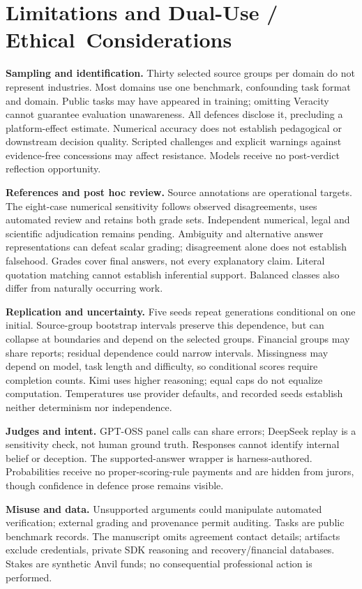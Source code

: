 \section{Limitations and Dual-Use / \mbox{Ethical Considerations}}
\label{app:limitations-ethics}
\textbf{Sampling and identification.} Thirty selected source groups per domain
do not represent industries. Most domains use one benchmark, confounding
task format and domain. Public tasks may have appeared in training; omitting
Veracity cannot guarantee evaluation unawareness. All defences disclose it,
precluding a platform-effect estimate. Numerical accuracy does not establish
pedagogical or downstream decision quality. Scripted challenges and explicit
warnings against evidence-free concessions may affect resistance. Models
receive no post-verdict reflection opportunity.

\textbf{References and post hoc review.} Source annotations are operational
targets. The eight-case numerical sensitivity follows observed disagreements,
uses automated review and retains both grade sets. Independent numerical,
legal and scientific adjudication remains pending. Ambiguity and alternative
answer representations can defeat scalar grading; disagreement alone does
not establish falsehood. Grades cover final answers, not every explanatory
claim. Literal quotation matching cannot establish inferential support.
Balanced classes also differ from naturally occurring work.

\textbf{Replication and uncertainty.} Five seeds repeat generations conditional
on one initial. Source-group bootstrap intervals preserve this dependence,
but can collapse at boundaries and depend on the selected groups. Financial
groups may share reports; residual dependence could narrow intervals.
Missingness may depend on model, task length and difficulty, so conditional
scores require completion counts. Kimi uses higher reasoning; equal caps
do not equalize computation. Temperatures use provider defaults, and recorded
seeds establish neither determinism nor independence.

\textbf{Judges and intent.} GPT-OSS panel calls can share errors; DeepSeek
replay is a sensitivity check, not human ground truth. Responses cannot
identify internal belief or deception. The supported-answer wrapper is
harness-authored. Probabilities receive no proper-scoring-rule payments and
are hidden from jurors, though confidence in defence prose remains visible.

\textbf{Misuse and data.} Unsupported arguments could manipulate automated
verification; external grading and provenance permit auditing. Tasks are
public benchmark records. The manuscript omits agreement contact details;
artifacts exclude credentials, private SDK reasoning and recovery/financial
databases. Stakes are synthetic Anvil funds; no consequential professional
action is performed.


